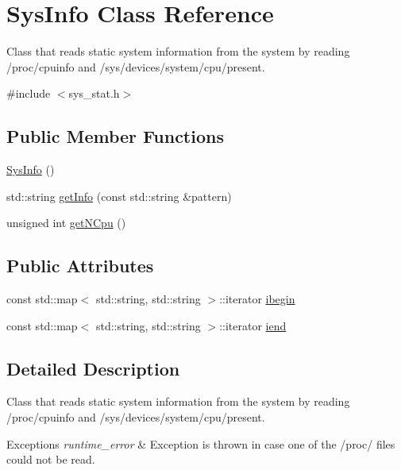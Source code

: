 \hypertarget{classSysInfo}{}\section{Sys\+Info Class Reference}
\label{classSysInfo}


Class that reads static system information from the system by reading {\ttfamily /proc/cpuinfo} and {\ttfamily /sys/devices/system/cpu/present}.  




{\ttfamily \#include $<$sys\+\_\+stat.\+h$>$}

\subsection*{Public Member Functions}
\begin{DoxyCompactItemize}
\item 
\hyperlink{classSysInfo_ad5810112be02a38d5d4aecc95724c656}{Sys\+Info} ()
\item 
std\+::string \hyperlink{classSysInfo_a429fb6d15d8790484be15eca47f7a1d5}{get\+Info} (const std\+::string \&pattern)
\item 
unsigned int \hyperlink{classSysInfo_a836d6f2b00e37dd02caa17c18cce8492}{get\+N\+Cpu} ()
\end{DoxyCompactItemize}
\subsection*{Public Attributes}
\begin{DoxyCompactItemize}
\item 
const std\+::map$<$ std\+::string, std\+::string $>$\+::iterator \hyperlink{classSysInfo_a029299d61d0464b1cfd58fe36c453a9d}{ibegin}
\item 
const std\+::map$<$ std\+::string, std\+::string $>$\+::iterator \hyperlink{classSysInfo_a919f49790a9ab98a5690714c75ac261b}{iend}
\end{DoxyCompactItemize}


\subsection{Detailed Description}
Class that reads static system information from the system by reading {\ttfamily /proc/cpuinfo} and {\ttfamily /sys/devices/system/cpu/present}. 


\begin{DoxyExceptions}{Exceptions}
{\em runtime\+\_\+error} & Exception is thrown in case one of the /proc/ files could not be read. \\
\hline
\end{DoxyExceptions}


